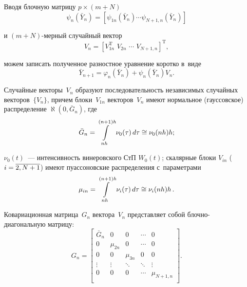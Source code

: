 \begin{multicols}{2}
\vspace*{-2pt}

\noindent
Вводя блочную матрицу $p\times(m+N)$
    \begin{equation*}
    \psi_n(\bar Y_n)=\left[\psi_{1n}(\bar Y_n) \cdots \psi_{N+1,n}(\bar
    Y_n)\right] %
    \end{equation*}
    
    \vspace*{-2pt}

\noindent
и $(m+N)$-мерный случайный вектор
    \begin{equation*}
    V_n=\left[ V_{1n}^{\mathrm{T}}\,\, V_{2n}\,\,\cdots \,\, V_{N+1,n}\right]^{\mathrm{T}},
    \end{equation*}
    
    \vspace*{-2pt}

\noindent
можем записать полученное разностное уравнение коротко в~виде
    \begin{equation}
    \bar Y_{n+1}=\varphi_n(\bar Y_n)+\psi_n(\bar Y_n)V_n. \label{e3.7-s}
    \end{equation}

\vspace*{-2pt}


Случайные векторы~$V_n$ образуют
последовательность независимых случайных векторов~$\{V_n\}$, причем
блоки~$V_{1n}$ векторов~$V_n$ имеют нормальное (гауссовское) распределение 
$\aleph(0,\bar G_n)$, где
    \begin{equation*}
    \bar G_n =\inh \nu_0(\tau)\,d\tau \cong \nu_0(nh)h; %
    \end{equation*}
    
    \vspace*{-2pt}

\noindent
$\nu_0(t)$~--- интенсивность винеровского СтП $W_0(t)$;
скалярные блоки $V_{{in}}$ ($i\hm=\overline{2,N+1}$) имеют пуассоновские
распределения с~параметрами
\begin{equation*}
\mu_{{in}}=\inh \nu_i(\tau)\,d\tau \cong \nu_i(nh)h\,. %
\end{equation*}

\vspace*{-2pt}


Ковариационная матрица~$G_n$ вектора~$V_n$
представляет собой блоч\-но-диа\-го\-наль\-ную мат\-рицу:
\begin{equation*}
G_n=
\begin{bmatrix}
    \bar G_n &0 &0 &\cdots &0\\
    0 &\mu_{2n} &0 &\cdots &0\\
    0&0&\mu_{3n} &0&0\\
    \vdots &\vdots &\ddots &\ddots &\vdots\\
    0 &0 &0 &\cdots &\mu_{N+1,n}\\
\end{bmatrix}.
\end{equation*}


\end{multicols}
